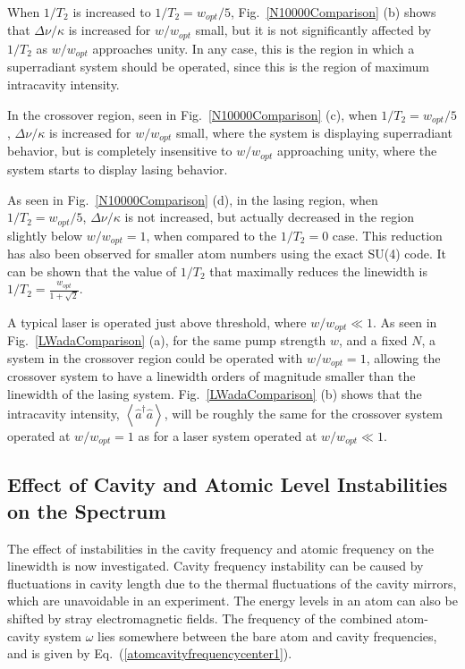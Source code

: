 \documentclass[aps,prl,twocolumn,
superscriptaddress,groupedaddress]{revtex4}
\begin{document}
When $1/T_2$ is increased to $1/T_2=w_{opt}/5$,
Fig.~\ref{N10000Comparison} (b) shows that $\Delta \nu/\kappa$ is
increased for $w/w_{opt}$ small, but it is not significantly affected by
$1/T_2$ as $w/w_{opt}$ approaches unity. In any case, this is the region
in which a superradiant system should be operated, since this is the
region of maximum intracavity intensity.

In the crossover region, seen in Fig.~\ref{N10000Comparison} (c), when
$1/T_2=w_{opt}/5$, $\Delta \nu/\kappa$ is increased for $w/w_{opt}$
small, where the system is displaying superradiant behavior, but is
completely insensitive to $w/w_{opt}$ approaching unity, where the
system starts to display lasing behavior.

As seen in Fig.~\ref{N10000Comparison} (d), in the lasing region, when
$1/T_2=w_{opt}/5$, $\Delta \nu/\kappa$ is not increased, but actually
decreased in the region slightly below $w/w_{opt}=1$, when compared to
the $1/T_2=0$ case. This reduction has also been observed for smaller
atom numbers using the exact SU(4) code. It can be shown that the value
of $1/T_2$ that maximally reduces the linewidth is
$1/T_2=\frac{w_{opt}}{1+\sqrt{2}}$.

A typical laser is operated just above threshold, where $w/w_{opt} \ll
1$. As seen in Fig.~\ref{LWadaComparison} (a), for the same pump
strength $w$, and a fixed $N$, a system in the crossover region could be
operated with $w/w_{opt} = 1$, allowing the crossover system to have a
linewidth orders of magnitude smaller than the linewidth of the lasing
system. Fig.~\ref{LWadaComparison} (b) shows that the intracavity
intensity, $\left<\hat{a}^{\dagger}\hat{a}\right>$, will be roughly the
same for the crossover system operated at $w/w_{opt} = 1$ as for a laser
system operated at  $w/w_{opt} \ll 1$.


\subsection{Effect of Cavity and Atomic Level Instabilities on the
Spectrum}

The effect of instabilities in the cavity frequency and atomic frequency
on the linewidth is now investigated. Cavity frequency instability can
be caused by fluctuations in cavity length due to the thermal
fluctuations of the cavity mirrors, which are unavoidable in an
experiment. The energy levels in an atom can also be shifted by stray
electromagnetic fields. The frequency of the combined atom-cavity system
$\omega$ lies somewhere between the bare atom and cavity frequencies,
and is given by Eq.~(\ref{atomcavityfrequencycenter1}).
\end{document}
